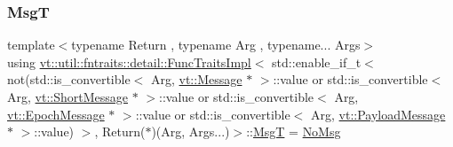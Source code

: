 \subsubsection{\texorpdfstring{MsgT}{MsgT}}
{\footnotesize\ttfamily template$<$typename Return , typename Arg , typename... Args$>$ \\
using \hyperlink{structvt_1_1util_1_1fntraits_1_1detail_1_1_func_traits_impl}{vt\+::util\+::fntraits\+::detail\+::\+Func\+Traits\+Impl}$<$ std\+::enable\+\_\+if\+\_\+t$<$ not(std\+::is\+\_\+convertible$<$ Arg, \hyperlink{namespacevt_a3a3ddfef40b4c90915fa43cdd5f129ea}{vt\+::\+Message} $\ast$ $>$\+::value or std\+::is\+\_\+convertible$<$ Arg, \hyperlink{namespacevt_a1125ac1da6c0bbf141e0ea0739d7602d}{vt\+::\+Short\+Message} $\ast$ $>$\+::value or std\+::is\+\_\+convertible$<$ Arg, \hyperlink{namespacevt_ad67368ffae52d7325002586b41bb150e}{vt\+::\+Epoch\+Message} $\ast$ $>$\+::value or std\+::is\+\_\+convertible$<$ Arg, \hyperlink{namespacevt_a89a92229c5622b855c02c549f83a1a68}{vt\+::\+Payload\+Message} $\ast$ $>$\+::value) $>$, Return($\ast$)(Arg, Args...)$>$\+::\hyperlink{structvt_1_1util_1_1fntraits_1_1detail_1_1_func_traits_impl_3_01std_1_1enable__if__t_3_01not_07s3fd5866f31025a6fa1e7500192630846_a2c8420778da985fde9ecbcc610fac156}{MsgT} =  \hyperlink{structvt_1_1util_1_1fntraits_1_1detail_1_1_no_msg}{No\+Msg}}


